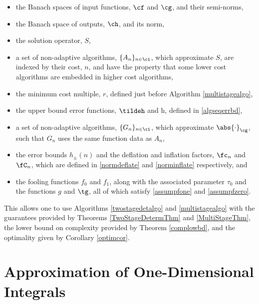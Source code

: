 \documentclass[]{elsarticle}
\theoremstyle{definition}
\theoremstyle{remark}
\newcommand{\Gnorm}[1]{\abs{#1}_{\cg}}
\begin{document}
\begin{itemize}

\item the Banach spaces of input functions, $\cf$ and $\cg$, and their semi-norms, 

\item the Banach space of outputs, $\ch$, and its norm,

\item the solution operator, $S$,

\item a set of non-adaptive algorithms, $\{A_n\}_{n \in \ci}$, which approximate $S$, are indexed by their cost, $n$, and have the property that some lower cost algorithms are embedded in higher cost algorithms,

\item the minimum cost multiple, $r$, defined just before Algorithm \ref{multistagealgo},

\item the upper bound error functions, $\tildeh$ and h, defined in \eqref{algseqerrbd}, 

\item a set of non-adaptive algorithms, $\{G_n\}_{n \in \ci}$, which approximate $\Gnorm{\cdot}$, such that $G_n$ uses the same function data as $A_n$,

\item the error bounds $h_{\pm}(n)$ and the deflation and inflation factors, $\fc_n$ and $\fC_n$, which are defined in \eqref{normdeflate} and \eqref{norminflate} respectively, and

\item the fooling functions $f_0$ and $f_1$, along with the associated parameter $\tau_0$ and the functions $g$ and $\tg$, all of which satisfy \eqref{assumpfone} and \eqref{assumpfzero}.

\end{itemize}
This allows one to use Algorithms \ref{twostagedetalgo} and \ref{multistagealgo} with the guarantees provided by Theorems \ref{TwoStageDetermThm} and \ref{MultiStageThm}, the lower bound on complexity provided by Theorem \ref{complowbd}, and the optimality given by Corollary \ref{optimcor}.


\section{Approximation of One-Dimensional Integrals} \label{integsec}


\end{document}
